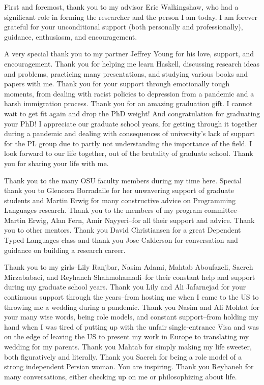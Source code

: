 %
First and foremost, thank you to my advisor Eric Walkingshaw, who had a significant
role in forming the researcher and the person I am today. 
I am forever grateful for your unconditional support
(both personally and professionally), guidance, enthusiasm, and encouragement. 

%
A very special thank you to my partner Jeffrey Young for his love, support, and 
encouragement. Thank you for helping me learn Haskell, discussing research ideas and problems,
practicing many presentations, and studying various books and papers with me. 
Thank you for your support through emotionally tough moments, from dealing with racist policies
to depression from a pandemic and a harsh immigration process. 
Thank you for an amazing graduation gift. I cannot wait to get fit again and drop the PhD weight! And congratulation for graduating your PhD! 
I appreciate our graduate school years, for getting through it together during a pandemic and dealing with consequences of university's lack of support for the PL group due to partly 
not  understanding the importance of the field. 
I look forward to our life together, out of the brutality of graduate school.
Thank you for sharing your life with me.

Thank you to the many OSU faculty members during my time here. 
Special thank you to Glencora Borradaile for her unwavering support 
of graduate students and Martin Erwig for many constructive advice on 
Programming Languages research.
Thank you to the members of my program committee--Martin Erwig, 
Alan Fern, Amir Nayyeri--for all their support and advice. 
Thank you to other mentors. Thank you David Christiansen for a great Dependent Typed Languages class
and thank you Jose Calderson for conversation and guidance on building a research career.

Thank you to my girls--Lily Ranjbar, 
Nasim Adami, Mahtab Aboufazeli, Saereh Mirzababaei, and Reyhaneh Shahmohamadi--for their constant help and support
during my graduate school years.
%
Thank you Lily and Ali Jafarnejad for your continuous support through the years--from 
hosting me when I came to the US to throwing me a wedding during a pandemic. 
%
Thank you Nasim 
and Ali Mohtat for your many wise words, being role models, and constant support--from
holding my hand when I was tired 
of putting up with the unfair single-entrance Visa and was on the edge of leaving the US to 
present my work in Europe to translating my wedding for my parents.
%
Thank you Mahtab for simply making my life sweeter, both figuratively and literally. 
%
Thank you Saereh for being a role model of a strong independent Persian woman. You are inspiring.
% 
Thank you Reyhaneh for many conversations, either checking up on me or philosophizing about life.


